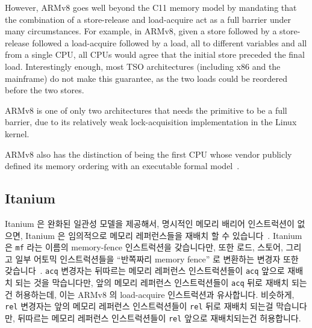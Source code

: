 However, ARMv8 goes well beyond the C11 memory model by mandating that
the combination of a store-release and load-acquire act as a full
barrier under many circumstances.
For example, in ARMv8, given a store followed by a store-release followed
a load-acquire followed by a load, all to different variables and all from
a single CPU, all CPUs
would agree that the initial store preceded the final load.
Interestingly enough, most TSO architectures (including x86 and the
mainframe) do not make this guarantee, as the two loads could be
reordered before the two stores.

ARMv8 is one of only two architectures that needs the
 primitive to be a full barrier,
due to its relatively weak lock-acquisition implementation in
the Linux kernel.

ARMv8 also has the distinction of being the first CPU whose vendor publicly
defined its memory ordering with an executable formal model~\cite{ARMv8A:2017}.
\fi

\subsection{Itanium}
\label{sec:memorder:Itanium}

Itanium 은 완화된 일관성 모델을 제공해서, 명시적인 메모리 배리어 인스트럭션이
없으면, Itanium 은 임의적으로 메모리 레퍼런스들을 재배치 할 수
있습니다~\cite{IntelItanium02v2}.
Itanium 은 {\tt mf} 라는 이름의 memory-fence 인스트럭션을 갖습니다만, 또한
로드, 스토어, 그리고 일부 어토믹 인스트럭션들을 ``반쪽짜리 memory fence'' 로
변환하는 변경자 또한 갖습니다~\cite{IntelItanium02v2}.
{\tt acq} 변경자는 뒤따르는 메모리 레퍼런스 인스트럭션들이 {\tt acq} 앞으로
재배치 되는 것을 막습니다만, 앞의 메모리 레퍼런스 인스트럭션들이 {\tt acq} 뒤로
재배치 되는건 허용하는데, 이는 ARMv8 의 load-acquire 인스트럭션과 유사합니다.
비슷하게, {\tt rel} 변경자는 앞의 메모리 레퍼런스 인스트럭션들이 {\tt rel} 뒤로
재배치 되는걸 막습니다만, 뒤따르는 메모리 레퍼런스 인스트럭션들이 {\tt rel}
앞으로 재배치되는건 허용합니다.


